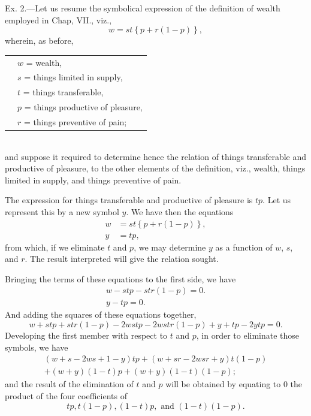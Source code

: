 \documentclass[oneside]{book}
\begin{document}
Ex. 2.---Let us resume the symbolical expression of the definition
of wealth employed in Chap, VII., viz.,
\[
w = st \left\{p + r\left(1 - p\right)\right\},
\]
wherein, as before, \\
\begin{tabular}{c l}
&$w$ = \textrm{wealth,}\\
&$s$ = \textrm{things limited in supply,}\\
&$t$ = \textrm{things transferable,}\\
&$p$ = \textrm{things productive of pleasure,}\\
&$r$ = \textrm{things preventive of pain;}
\end{tabular}\\
and suppose it required to determine hence the relation of things
transferable and productive of pleasure, to the other elements of
the definition, viz., wealth, things limited in supply, and things
preventive of pain.

The expression for things transferable and productive of pleasure
is $tp$. Let us represent this by a new symbol $y$. We have
then the equations
\begin{eqnarray*}
w &= st\left\{p + r\left(1-p\right)\right\},\\
y &= tp,
\end{eqnarray*}
from which, if we eliminate $t$ and $p$, we may determine $y$ as a
function of $w$, $s$, and $r$. The result interpreted will give the relation
sought.

Bringing the terms of these equations to the first side, we
have %
\setcounter{equation}{2}
\begin{eqnarray}
w - stp - str \left(1 - p\right) = 0.\nonumber\\
y - tp = 0.
\end{eqnarray}
And adding the squares of these equations together,
\begin{equation}
w + stp + str \left(1-p\right) - 2wstp - 2wstr\left(1-p\right) + y + tp - 2ytp = 0.
\end{equation}
Developing the first member with respect to $t$ and $p$, in order to
eliminate those symbols, we have
\begin{eqnarray}
\left(w+s-2ws+1-y\right)tp + \left(w+sr-2wsr+y\right)t\left(1-p\right)\nonumber\\
+\left(w+y\right)\left(1-t\right)p+\left(w+y\right)\left(1-t\right)\left(1-p\right);
\end{eqnarray}
and the result of the elimination of $t$ and $p$ will be obtained by
equating to $0$ the product of the four coefficients of
\[
tp, t\left(1-p\right), \left(1-t\right)p,\textrm{ and } \left(1-t\right)\left(1-p\right).
\]
\end{document}
